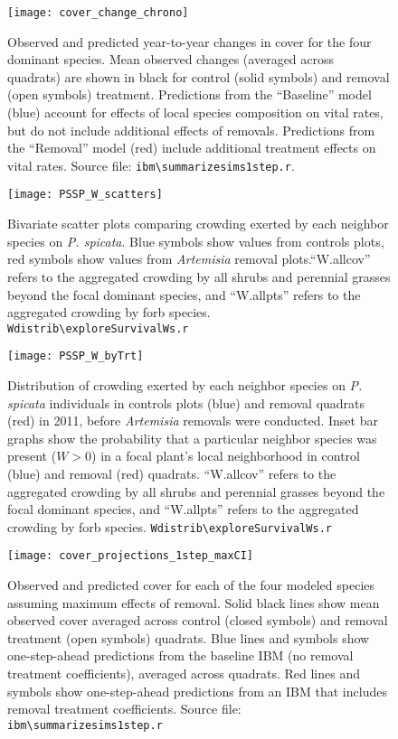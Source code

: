 \documentclass[11pt]{article}
\begin{document}
  \begin{figure}[tbp]
  \centering
  \texttt{[image: cover\_change\_chrono]}
  \caption{Observed and predicted year-to-year changes in cover for the four dominant species. Mean observed changes (averaged across quadrats) are shown in black for control (solid symbols) and removal (open symbols) treatment. Predictions from the ``Baseline'' model (blue) account for effects of local species composition on vital rates, but do not include additional effects of removals. Predictions from the ``Removal'' model (red) include additional treatment effects on vital rates. Source file: \texttt{ibm\textbackslash summarize\textunderscore sims1step.r}. }
  \label{fig:CoverChange}
  \end{figure}
 
  \begin{figure}[tbp]
  \centering
  \texttt{[image: PSSP\_W\_scatters]}
  \caption{Bivariate scatter plots comparing crowding exerted by each neighbor species on \textit{P. spicata}. Blue symbols show values from controls plots, red symbols show values from \textit{Artemisia} removal plots.``W.allcov'' refers to the aggregated crowding by all shrubs and perennial grasses beyond the focal dominant species, and ``W.allpts'' refers to the aggregated crowding by forb species.  \texttt{Wdistrib\textbackslash exploreSurvivalWs.r} }
  \label{fig:Wscatters}
  \end{figure}
  
  \begin{figure}[tbp]
 \centering
 \texttt{[image: PSSP\_W\_byTrt]}
 \caption{Distribution of crowding exerted by each neighbor species on \textit{P. spicata} individuals in controls plots (blue) and removal quadrats (red) in 2011, before \textit{Artemisia}  removals were conducted. Inset bar graphs show the probability that a particular neighbor species was present ($W>0$) in a focal plant's local neighborhood in control (blue) and removal (red) quadrats. ``W.allcov'' refers to the aggregated crowding by all shrubs and perennial grasses beyond the focal dominant species, and ``W.allpts'' refers to the aggregated crowding by forb species.  \texttt{Wdistrib\textbackslash exploreSurvivalWs.r} }
 \label{fig:W-by-treatment}
 \end{figure}

 \begin{figure}[tbp]
 \centering
 \texttt{[image: cover\_projections\_1step\_maxCI]}
 \caption{Observed and predicted cover for each of the four modeled species assuming maximum effects of removal. 
  Solid black lines show mean observed cover averaged across control (closed symbols) and removal treatment (open symbols) quadrats. Blue lines and symbols show one-step-ahead predictions from the baseline IBM (no removal treatment coefficients), averaged across quadrats. Red lines and symbols show one-step-ahead predictions from an IBM that includes removal treatment coefficients. Source file: \texttt{ibm\textbackslash summarize\textunderscore sims1step.r} }
 \label{fig:IBM1step-maxCI}
 \end{figure}
 
\end{document}
